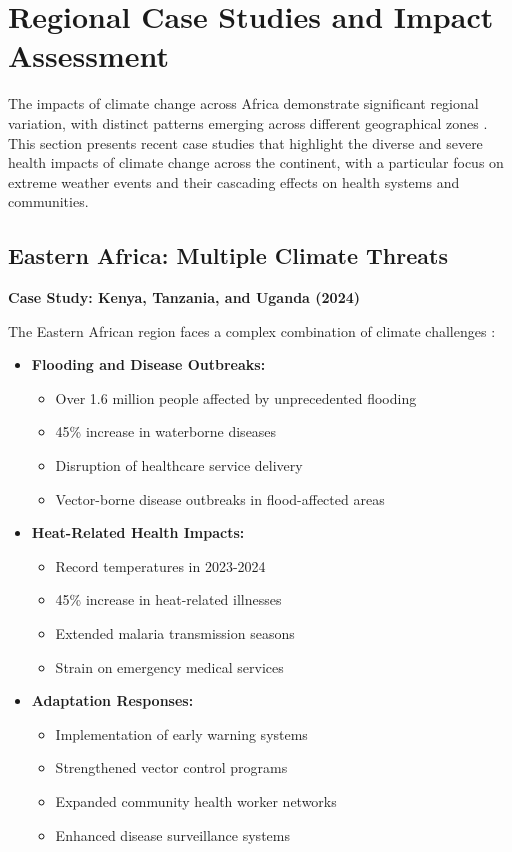 \section{Regional Case Studies and Impact Assessment}
\label{sec:case_studies}

The impacts of climate change across Africa demonstrate significant regional variation, with distinct patterns emerging across different geographical zones \citep{diamlini2024}. This section presents recent case studies that highlight the diverse and severe health impacts of climate change across the continent, with a particular focus on extreme weather events and their cascading effects on health systems and communities.

\subsection{Eastern Africa: Multiple Climate Threats}
\textbf{Case Study: Kenya, Tanzania, and Uganda (2024)}

The Eastern African region faces a complex combination of climate challenges \citep{unocha2024east}:

\begin{itemize}
    \item \textbf{Flooding and Disease Outbreaks:}
    \begin{itemize}
        \item Over 1.6 million people affected by unprecedented flooding
        \item 45\% increase in waterborne diseases
        \item Disruption of healthcare service delivery
        \item Vector-borne disease outbreaks in flood-affected areas
    \end{itemize}
    
    \item \textbf{Heat-Related Health Impacts:}
    \begin{itemize}
        \item Record temperatures in 2023-2024
        \item 45\% increase in heat-related illnesses
        \item Extended malaria transmission seasons
        \item Strain on emergency medical services
    \end{itemize}
    
    \item \textbf{Adaptation Responses:}
    \begin{itemize}
        \item Implementation of early warning systems
        \item Strengthened vector control programs
        \item Expanded community health worker networks
        \item Enhanced disease surveillance systems
    \end{itemize}
\end{itemize}

